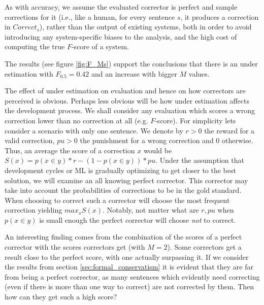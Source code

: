 \documentclass[letter,11pt]{article}
\newcommand{\com}[1]{}
\newcommand{\lc}[1]{\footnote{\color{green}LC: #1}}
\begin{document}
		As with accuracy, we assume the evaluated corrector is perfect and sample corrections for it
		(i.e., like a human, for every sentence $s$, it produces a correction in $Correct_s$),
		rather than the output of existing systems, both
		in order to avoid introducing any system-specific biases to the analysis,
		and the high cost of computing the true $F$-score of a system.
		
		The results (see figure \ref{fig:F_Ms}) support the conclusions that there is an under estimation with $F_{0.5} = 0.42$ and an increase with bigger $M$ values.
		
		
		
		The effect of under estimation on evaluation and hence on how correctors are perceived is obvious. 
		Perhaps less obvious will be how under estimation affects the development
		process. We shall consider any evaluation which scores a wrong correction lower than no correction at all (e.g. $F$-score). For simplicity lets consider a scenario with only one sentence. We denote by $r>0$ the reward for a valid correction, $pu>0$ the punishment for a wrong correction and 0 otherwise. Thus, an average the score of a correction $x$ would be $S\left(x\right) = p\left(x\in y\right)*r - \left(1-p\left(x\in y\right)\right)*pu$.
		Under the assumption that development cycles or ML is gradually optimizing to get closer to the best solution, we will examine an all knowing perfect corrector.
		This corrector may take into account the probabilities of corrections to be in the gold standard. When choosing to correct such a corrector will choose the most frequent correction yielding $max_xS\left(x\right)$. Notably, not matter what are $r, pu$ when $p\left(x\in y\right)$ is small enough the perfect corrector will choose \emph{not} to correct.
		
		An interesting finding comes from the combination of the scores of a perfect corrector with the scores correctors get (with $M=2$). Some correctors get a result close to the perfect score, with one actually surpassing it. If we consider the results from section \ref{sec:formal_conservatism} it is evident that they are far from being a perfect corrector, as many sentences which evidently need correcting (even if there is more than one way to correct) are not corrected by them. Then how can they get such a high score?
		
		\com{\lc{Is that the right place for this general discussion of when can a system over-correct? Isn't that a prediction that drives us to look at the multi reference? I can't find any other place in which we discuss why over conservatism comes from this problem. could it be? where should this argument come?}
		Consider an all knowing perfect corrector, this corrector takes into account the evaluation coverage and knows the probabilities of corrections to be in the gold standard. Such a corrector will choose the most frequent correction, or no correction at all.  Notably, it will choose not correct when the increase in precision when the correction is in the gold standard contributes in expectation less to the $F$ score than the loss in recall for the times it is not in the gold standard.}
		
\end{document}
